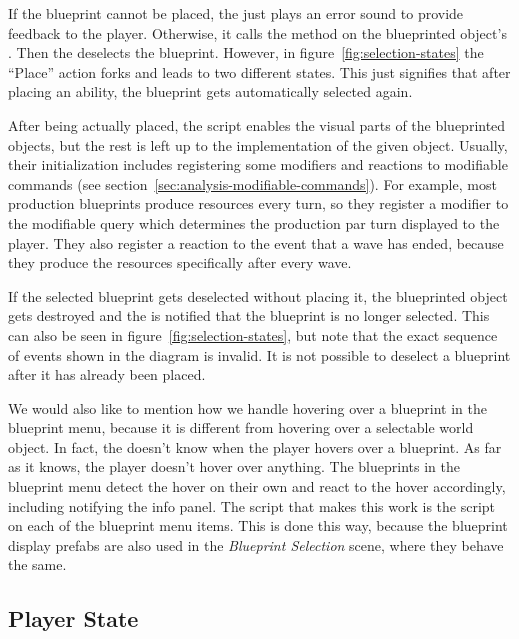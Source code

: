 If the blueprint cannot be placed, the  just plays an error sound to provide feedback to the player.
Otherwise, it calls the  method on the blueprinted object's .
Then the  deselects the blueprint.
However, in figure~\ref{fig:selection-states} the \enquote{Place} action forks and leads to two different states.
This just signifies that after placing an ability, the blueprint gets automatically selected again.

After being actually placed, the  script enables the visual parts of the blueprinted objects, but the rest is left up to the implementation of the given object.
Usually, their initialization includes registering some modifiers and reactions to modifiable commands (see section~\ref{sec:analysis-modifiable-commands}).
For example, most production blueprints produce resources every turn, so they register a modifier to the modifiable query which determines the production par turn displayed to the player.
They also register a reaction to the event that a wave has ended, because they produce the resources specifically after every wave.

If the selected blueprint gets deselected without placing it, the blueprinted object gets destroyed and the  is notified that the blueprint is no longer selected.
This can also be seen in figure~\ref{fig:selection-states}, but note that the exact sequence of events shown in the diagram is invalid.
It is not possible to deselect a blueprint after it has already been placed.

We would also like to mention how we handle hovering over a blueprint in the blueprint menu, because it is different from hovering over a selectable world object.
In fact, the  doesn't know when the player hovers over a blueprint.
As far as it knows, the player doesn't hover over anything.
The blueprints in the blueprint menu detect the hover on their own and react to the hover accordingly, including notifying the info panel.
The script that makes this work is the  script on each of the blueprint menu items.
This is done this way, because the blueprint display prefabs are also used in the \emph{Blueprint Selection} scene, where they behave the same.

\subsection{Player State}

